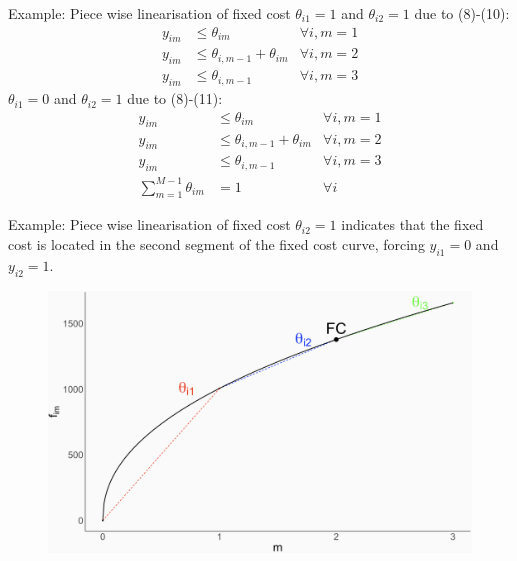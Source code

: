 \documentclass[xcolor=dvipsnames,aspectratio=169, handout, mathserif]{beamer}
\begin{document}
\begin{frame}{Example: Piece wise linearisation of fixed cost }
    $\theta_{i1}=1$ and $\theta_{i2}=1$ due to (8)-(10):
    \begin{align*}
        y_{im} &\leq \theta_{im} & \forall i, m = 1\\
        y_{im} &\leq \theta_{i,m-1} + \theta_{im}  & \forall i, m = 2 \\
        y_{im} &\leq \theta_{i,m-1} & \forall i, m = 3
    \end{align*}
 $\theta_{i1}=0$ and $\theta_{i2}=1$ due to (8)-(11):
    \begin{align*}
        y_{im} &\leq \theta_{im} & \forall i, m = 1\\
        y_{im} &\leq \theta_{i,m-1} + \theta_{im}  & \forall i, m = 2 \\
        y_{im} &\leq \theta_{i,m-1} & \forall i, m = 3 \\
        \sum_{m=1}^{M-1} \theta_{im} &= 1 & \forall i 
    \end{align*}
  
\end{frame}

\begin{frame}{Example: Piece wise linearisation of fixed cost }
    $\theta_{i2}=1$ indicates that the fixed cost is located in the second segment of the fixed cost curve, forcing $y_{i1}=0$ and $y_{i2}=1.$

         \begin{center}
\begin{figure}
    \centering
    \includegraphics[width=0.65\linewidth]{ap_FC.png}
\end{figure}
\end{center}
\end{frame}
\end{document}
